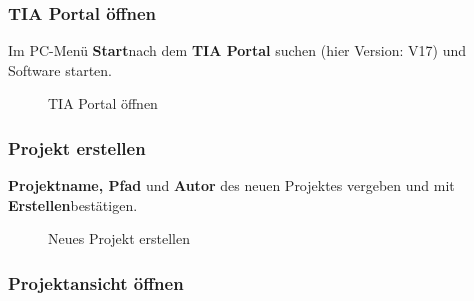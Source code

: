 \subsubsection{TIA Portal öffnen}

Im PC-Menü \glqq\textbf{Start}\grqq\:nach dem \textbf{TIA Portal} suchen (hier Version: V17) und Software starten.
\begin{figure}[H]
   \centering
   \caption[TIA Portal öffnen]{TIA Portal öffnen}
   \label{fig:Bild6.4}
\end{figure}

\subsubsection{Projekt erstellen}

\textbf{Projektname, Pfad} und \textbf{Autor} des neuen Projektes vergeben und mit \glqq\textbf{Erstellen}\grqq\:bestätigen.
\begin{figure}[H]
   \centering
   \caption[Neues Projekt erstellen]{Neues Projekt erstellen}
   \label{fig:Bild6.5}
\end{figure}

\clearpage

\subsubsection{Projektansicht öffnen}

